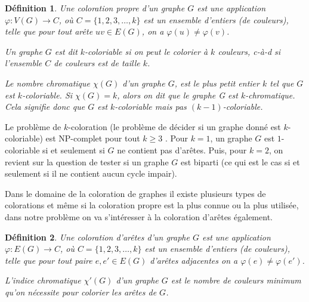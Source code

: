 \documentclass[10pt,a4paper]{article}
\newtheorem{definition}{Définition}
\newtheorem{exemple}{Exemple}
\begin{document}
\begin{definition}%
Une \emph{coloration propre} d'un graphe $G$ est une application $\varphi: V(G) \to C$, où $C=\{1,2,3,\dots,k\}$ est un ensemble d'entiers (de \emph{couleurs}), telle que pour tout arête $uv \in E(G)$, on a $\varphi(u) \neq \varphi(v)$. 

Un graphe $G$ est dit \emph{$k$-coloriable} si on peut le colorier à $k$ couleurs, c-à-d si l'ensemble $C$ de couleurs est de taille $k$. 

Le \emph{nombre chromatique} $\chi(G)$ d'un graphe $G$, est le plus petit entier $k$ tel que $G$ est $k$-coloriable. Si $\chi(G) = k$, alors on dit que le graphe G est \emph{$k$-chromatique}. Cela signifie donc que $G$ est $k$-coloriable mais  pas $(k-1)$-coloriable.
\end{definition}



Le problème de $k$-coloration (le problème de décider si un graphe donné est $k$-coloriable) est NP-complet pour tout $k \geq 3$ \cite{NP}. Pour $k = 1$, un graphe $G$ est $1$-coloriable si et seulement si $G$ ne contient pas d'arêtes. Puis, pour $k =  2$, on revient sur la question de tester si un graphe $G$ est biparti (ce qui est le cas si et seulement si il ne contient aucun cycle impair). 

Dans le domaine de la coloration de graphes il existe plusieurs types de colorations et même si la coloration propre est la plus connue ou la plus utilisée, dans notre problème on va s'intéresser à la coloration d'arêtes également.

\begin{definition}%
Une \emph{coloration d'arêtes} d'un graphe $G$ est une application $\varphi: E(G) \to C$, où $C=\{1,2,3,\dots,k\}$ est un ensemble d'entiers (de \emph{couleurs}), telle que pour tout paire $e, e' \in E(G)$ d'arêtes adjacentes on a $\varphi(e) \neq \varphi(e')$.

L'\emph{indice chromatique} $\chi'(G)$ d'un graphe $G$ est le nombre de couleurs minimum qu'on nécessite pour colorier les arêtes de $G$.
\end{definition}
\end{document}
